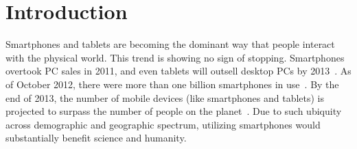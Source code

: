 \section{Introduction}
Smartphones and tablets are becoming the dominant way that people interact with
the physical world.  This trend is showing no sign of stopping.  Smartphones
overtook PC sales in 2011, and even tablets will outsell desktop PCs by
2013~\cite{phonesales}. As of October 2012, there were more than one billion
smartphones in use~\cite{smartphones-use}. By the end of 2013, the number of
mobile devices (like smartphones and tablets) is projected to surpass the number
of people on the planet~\cite{cisco-data}. Due to such ubiquity across
demographic and geographic spectrum, utilizing smartphones would substantially
benefit science and humanity.

